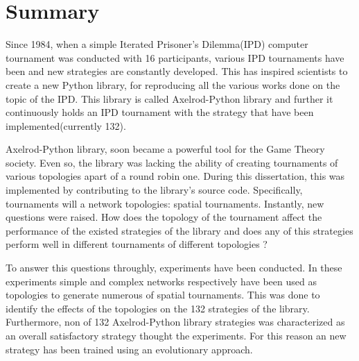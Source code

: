 \chapter{Summary}

Since 1984, when a simple Iterated Prisoner's Dilemma(IPD) computer tournament was
conducted with 16 participants, various IPD tournaments have been and new strategies
are constantly developed. This has inspired scientists to create a new Python
library, for reproducing all the various works done on the topic of the IPD. This
library is called Axelrod-Python library and further it continuously holds
an IPD tournament with the strategy that have been implemented(currently 132).

Axelrod-Python library, soon became a powerful tool for the Game Theory society.
Even so, the library was lacking the ability of creating tournaments of various
topologies apart of a round robin one. During this dissertation, this was implemented
by contributing to the library's source code. Specifically, tournaments will a
network topologies: spatial tournaments. Instantly, new questions were raised.
How does the topology of the tournament affect the performance of the existed
strategies of the library and does any of this strategies perform well in
different tournaments of different topologies ?

To answer this questions throughly, experiments have been conducted. In these
experiments simple and complex networks respectively have been used as topologies
to generate numerous of spatial tournaments. This was done to identify the effects
of the topologies on the 132 strategies of the library. Furthermore, non of 132
Axelrod-Python library strategies was characterized as an overall satisfactory
strategy thought the experiments. For this reason an new strategy has been trained
using an evolutionary approach.
